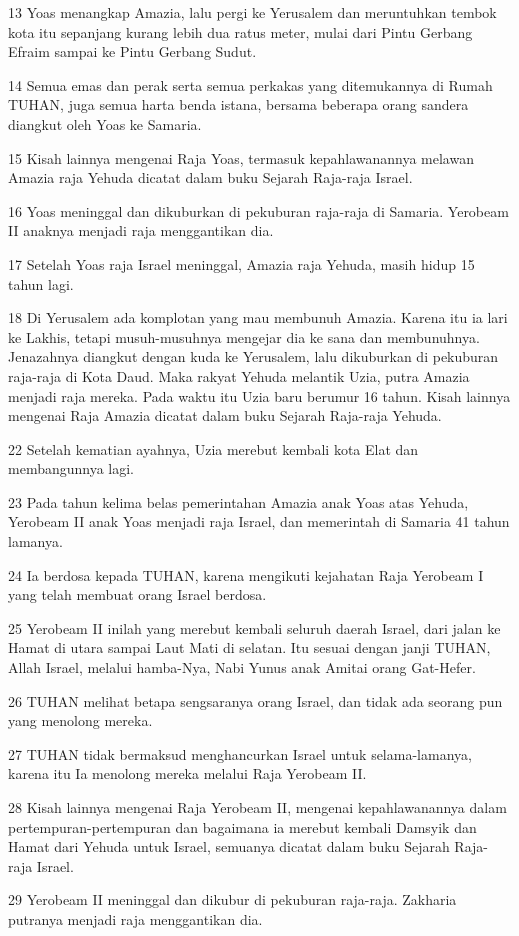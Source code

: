 \par 13 Yoas menangkap Amazia, lalu pergi ke Yerusalem dan meruntuhkan tembok kota itu sepanjang kurang lebih dua ratus meter, mulai dari Pintu Gerbang Efraim sampai ke Pintu Gerbang Sudut.
\par 14 Semua emas dan perak serta semua perkakas yang ditemukannya di Rumah TUHAN, juga semua harta benda istana, bersama beberapa orang sandera diangkut oleh Yoas ke Samaria.
\par 15 Kisah lainnya mengenai Raja Yoas, termasuk kepahlawanannya melawan Amazia raja Yehuda dicatat dalam buku Sejarah Raja-raja Israel.
\par 16 Yoas meninggal dan dikuburkan di pekuburan raja-raja di Samaria. Yerobeam II anaknya menjadi raja menggantikan dia.
\par 17 Setelah Yoas raja Israel meninggal, Amazia raja Yehuda, masih hidup 15 tahun lagi.
\par 18 Di Yerusalem ada komplotan yang mau membunuh Amazia. Karena itu ia lari ke Lakhis, tetapi musuh-musuhnya mengejar dia ke sana dan membunuhnya. Jenazahnya diangkut dengan kuda ke Yerusalem, lalu dikuburkan di pekuburan raja-raja di Kota Daud. Maka rakyat Yehuda melantik Uzia, putra Amazia menjadi raja mereka. Pada waktu itu Uzia baru berumur 16 tahun. Kisah lainnya mengenai Raja Amazia dicatat dalam buku Sejarah Raja-raja Yehuda.
\par 22 Setelah kematian ayahnya, Uzia merebut kembali kota Elat dan membangunnya lagi.
\par 23 Pada tahun kelima belas pemerintahan Amazia anak Yoas atas Yehuda, Yerobeam II anak Yoas menjadi raja Israel, dan memerintah di Samaria 41 tahun lamanya.
\par 24 Ia berdosa kepada TUHAN, karena mengikuti kejahatan Raja Yerobeam I yang telah membuat orang Israel berdosa.
\par 25 Yerobeam II inilah yang merebut kembali seluruh daerah Israel, dari jalan ke Hamat di utara sampai Laut Mati di selatan. Itu sesuai dengan janji TUHAN, Allah Israel, melalui hamba-Nya, Nabi Yunus anak Amitai orang Gat-Hefer.
\par 26 TUHAN melihat betapa sengsaranya orang Israel, dan tidak ada seorang pun yang menolong mereka.
\par 27 TUHAN tidak bermaksud menghancurkan Israel untuk selama-lamanya, karena itu Ia menolong mereka melalui Raja Yerobeam II.
\par 28 Kisah lainnya mengenai Raja Yerobeam II, mengenai kepahlawanannya dalam pertempuran-pertempuran dan bagaimana ia merebut kembali Damsyik dan Hamat dari Yehuda untuk Israel, semuanya dicatat dalam buku Sejarah Raja-raja Israel.
\par 29 Yerobeam II meninggal dan dikubur di pekuburan raja-raja. Zakharia putranya menjadi raja menggantikan dia.

